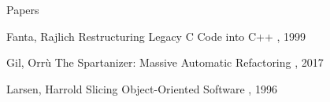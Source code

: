 \documentclass{beamer}
\begin{document}
\begin{frame}{Papers}
  \begin{thebibliography}{10}
    \beamertemplatearticlebibitems
    
      Fanta, Rajlich
      \newblock Restructuring Legacy C Code into C++
      , 1999
    
      Gil, Orrù
      \newblock The Spartanizer: Massive Automatic Refactoring
      , 2017
    
      Larsen, Harrold
      \newblock Slicing Object-Oriented Software
      , 1996
  \end{thebibliography}
\end{frame}
\end{document}
